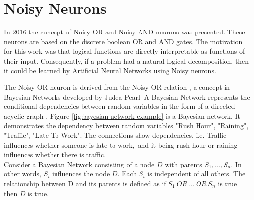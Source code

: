 \section{Noisy Neurons} \label{sec:background-noisy-neurons}
In 2016 the concept of Noisy-OR and Noisy-AND neurons \cite{LearningLogicalActivations} was presented. These neurons are based on the discrete boolean OR and AND gates. The motivation for this work was that logical functions are directly interpretable as functions of their input. Consequently, if a problem had a natural logical decomposition, then it could be learned by Artificial Neural Networks using Noisy neurons.

\noindent
\begin{minipage}[t]{0.6\textwidth}
\vspace{0px}
The Noisy-OR neuron is derived from the Noisy-OR relation \cite{russell1995modern}, a concept in Bayesian Networks developed by Judea Pearl. A Bayesian Network represents the conditional dependencies between random variables in the form of a directed acyclic graph \cite{neapolitan2004learning}. Figure \ref{fig:bayesian-network-example} is a Bayesian network. It demonstrates the dependency between random variables "Rush Hour", "Raining", "Traffic", "Late To Work". The connections show dependencies, i.e. Traffic influences whether someone is late to work,\ and it being rush hour or raining influences whether there is traffic.\\

Consider a Bayesian Network consisting of a node $D$ with parents $S_1,..., S_n$. In other words, $S_i$ influences the node $D$. Each $S_i$ is independent of all others. The relationship between D and its parents is defined as if $S_1\ OR\ ...\ OR\ S_n$ is true then $D$ is true.
\end{minipage}
\hspace{0.05\textwidth}
